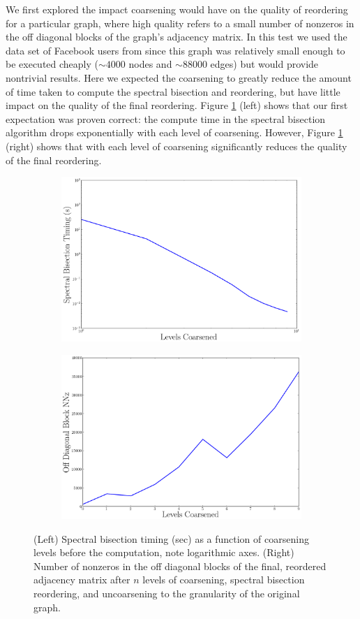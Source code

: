 \documentclass[11pt]{article}
\begin{document}
We first explored the impact coarsening would have on the quality of reordering
for a particular graph, where high quality refers to a small number of nonzeros in the
off diagonal blocks of the graph's adjacency matrix. In this test we used the
data set of Facebook users from \cite{facebook,snapnets} since this graph was
relatively small enough to be executed cheaply ($\sim 4000$ nodes and $\sim
88000$ edges) but would provide nontrivial results. Here we expected the
coarsening to greatly reduce the amount of time taken to compute the spectral
bisection and reordering, but have little impact on the quality of the final
reordering. Figure \ref{fig:tradeoff} (left) shows that our first expectation was
proven correct: the compute time in the spectral bisection algorithm drops
exponentially with each level of coarsening. However, Figure \ref{fig:tradeoff}
(right) shows that with each level of coarsening significantly reduces the quality of
the final reordering. 

\begin{figure}
\centering
\begin{subfigure}{.5\textwidth}
        \centering
        \includegraphics[width=.8\linewidth]{figs/sbTiming.png}
\end{subfigure}
\begin{subfigure}{.5\textwidth}
        \centering
        \includegraphics[width=.8\linewidth]{figs/offDiagNNz.png}
\end{subfigure}
\caption{(Left) Spectral bisection timing (sec) as a function of coarsening
levels before the computation, note logarithmic axes. (Right) Number of nonzeros
in the off diagonal blocks of the final, reordered adjacency matrix after $n$
levels of coarsening, spectral bisection reordering, and uncoarsening to
the granularity of the original graph.}
\label{fig:tradeoff}
\end{figure}
\end{document}
